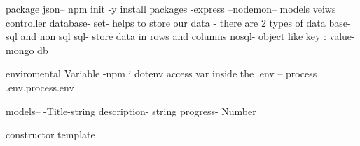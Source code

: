 package json-- npm init -y
install packages
-express
--nodemon--
models veiws controller 
database- set- helps to store our data 
- there are 2 types of data base- sql and non sql 
sql- store data in rows and columns
nosql- object like {key : value}- mongo db 

enviromental Variable 
-npm i dotenv 
access var inside the .env
-- process .env.process.env

models--
-Title-string
description- string
progress- Number 



constructor template